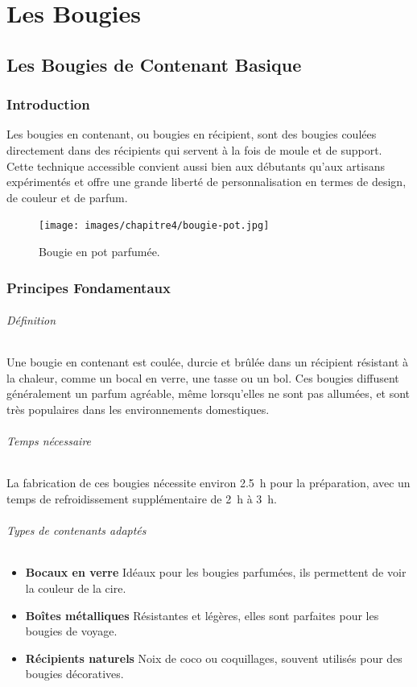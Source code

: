 \documentclass[11pt,fleqn,onecolumn,oneside]{book}
\begin{document}
\part{Les Bougies}
\chapter{Les Bougies de Contenant Basique}

\section{Introduction}

Les bougies en contenant, ou bougies en récipient, sont des bougies coulées directement dans des récipients qui servent à la fois de moule et de support. Cette technique accessible convient aussi bien aux débutants qu'aux artisans expérimentés et offre une grande liberté de personnalisation en termes de design, de couleur et de parfum.

\begin{figure}[htbp]
    \centering
    \texttt{[image: images/chapitre4/bougie-pot.jpg]}
    \caption{Bougie en pot parfumée.}
    \label{fig:process_coloration}
\end{figure}


\section{Principes Fondamentaux}

\paragraph{Définition} Une bougie en contenant est coulée, durcie et brûlée dans un récipient résistant à la chaleur, comme un bocal en verre, une tasse ou un bol. Ces bougies diffusent généralement un parfum agréable, même lorsqu’elles ne sont pas allumées, et sont très populaires dans les environnements domestiques.

\paragraph{Temps nécessaire} La fabrication de ces bougies nécessite environ \SI{2.5}{\hour} pour la préparation, avec un temps de refroidissement supplémentaire de \SI{2}{\hour} à \SI{3}{\hour}.

\paragraph{Types de contenants adaptés}
\begin{itemize}
    \item \textbf{Bocaux en verre} Idéaux pour les bougies parfumées, ils permettent de voir la couleur de la cire.
    \item \textbf{Boîtes métalliques} Résistantes et légères, elles sont parfaites pour les bougies de voyage.
    \item \textbf{Récipients naturels} Noix de coco ou coquillages, souvent utilisés pour des bougies décoratives.
\end{itemize}
\end{document}
